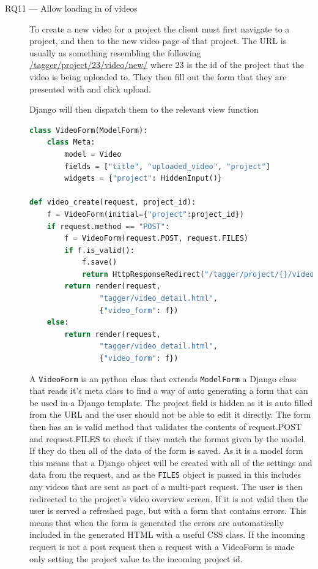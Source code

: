 \documentclass[12pt]{report}
\newcommand{\inlinecode}{\texttt}
\begin{document}
\begin{description}
    \item[RQ11 --- Allow loading in of videos] 
 To create a new video for a project the client must first navigate to a project, and then to the new video page of that project. The URL is usually as something resembling the following \url{/tagger/project/23/video/new/} where 23 is the id of the project that the video is being uploaded to. They then fill out the form that they are presented with and click upload. 

        Django will then dispatch them to the relevant view function

        \begin{lstlisting}[language=Python, breaklines=true]
class VideoForm(ModelForm):
    class Meta:
        model = Video
        fields = ["title", "uploaded_video", "project"]
        widgets = {"project": HiddenInput()}

def video_create(request, project_id):
    f = VideoForm(initial={"project":project_id})
    if request.method == "POST":
        f = VideoForm(request.POST, request.FILES)
        if f.is_valid():
            f.save()
            return HttpResponseRedirect("/tagger/project/{}/video/".format(project_id))
        return render(request,
                "tagger/video_detail.html",
                {"video_form": f})
    else: 
        return render(request,
                "tagger/video_detail.html",
                {"video_form": f})
        \end{lstlisting}

A \inlinecode{VideoForm} is an python class that extends \inlinecode{ModelForm} a Django class that reads it's meta class to find a way of auto generating a form that can be used in a Django template. The project field is hidden as it is auto filled from the URL and the user should not be able to edit it directly. The form then has an is valid method that validates the contents of request.POST and request.FILES to check if they match the format given by the model. If they do then all of the data of the form is saved. As it is a model form this means that a Django object will be created with all of the settings and data from the request, and as the \inlinecode{FILES} object is passed in this includes any videos that are sent as part of a multi-part request. The user is then redirected to the project's video overview screen. If it is not valid then the user is served a refreshed page, but with a form that contains errors. This means that when the form is generated the errors are automatically included in the generated HTML with a useful CSS class. If the incoming request is not a post request then a request with a VideoForm is made only setting the project value to the incoming project id. 


\end{description}
\end{document}
